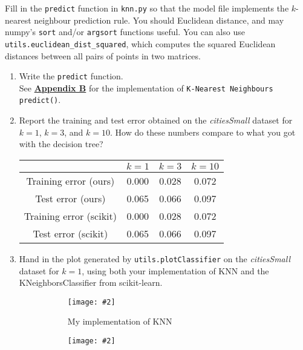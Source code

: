 \documentclass{article}
\def\blu#1{{\color{blu}#1}}
\def\ans#1{{\color{ans}#1}}
\newcommand{\centerfig}[2]{\begin{center}\texttt{[image: \#2]}\end{center}}
\def\enum#1{\begin{enumerate}#1\end{enumerate}}
\begin{document}
Fill in the \texttt{predict} function in \texttt{knn.py} so that the model file implements the $k$-nearest neighbour prediction rule.
You should Euclidean distance, and may numpy's \texttt{sort} and/or \texttt{argsort} functions useful.
You can also use \texttt{utils.euclidean\string_dist\string_squared}, which computes the squared Euclidean distances between all pairs of points in two matrices.
\blu{
\enum{
\item Write the \texttt{predict} function. \\
\ans{
   See \hyperref[appendix:KNN]{\textbf{Appendix B}} for the implementation of \texttt{K-Nearest Neighbours predict()}.
}
\item Report  the training and test error obtained on the \emph{citiesSmall} dataset for $k=1$, $k=3$, and $k=10$. How do these numbers compare to what you got with the decision tree? \\
\ans{
   \scriptsize
   \setlength{\tabcolsep}{2pt}
   \begin{center}
   \begin{tabular}{SSSS} \toprule
      {} & {$k = 1$} & {$k = 3$} & {$k = 10$} \\ \midrule
      {Training error (ours)} & 0.000 & 0.028 & 0.072 \\ 
      {Test error (ours)} & 0.065 & 0.066 & 0.097 \\ \midrule
      {Training error (scikit)} & 0.000 & 0.028 & 0.072 \\ 
      {Test error (scikit)} & 0.065 & 0.066 & 0.097 \\ \bottomrule
   \end{tabular}
   \end{center}
   \normalsize
}
\item Hand in the plot generated by \texttt{utils.plotClassifier} on the \emph{citiesSmall} dataset for $k=1$, using both your implementation of KNN and the KNeighborsClassifier from scikit-learn.
\begin{figure}[htp]
   \begin{subfigure}[b]{0.5\textwidth} \color{ans}
       \centerfig{1}{../figs/q3_3_myKNN}
       {
          \begin{center}
            My implementation of KNN
          \end{center}
      }
     \label{fig:1}
   \end{subfigure}
   \begin{subfigure}[b]{0.5\textwidth} \color{ans}
       \centerfig{1}{../figs/q3_3_scikitKNN}
      {
          \begin{center}

\end{center}}
\end{subfigure}
\end{figure}}}
\end{document}

